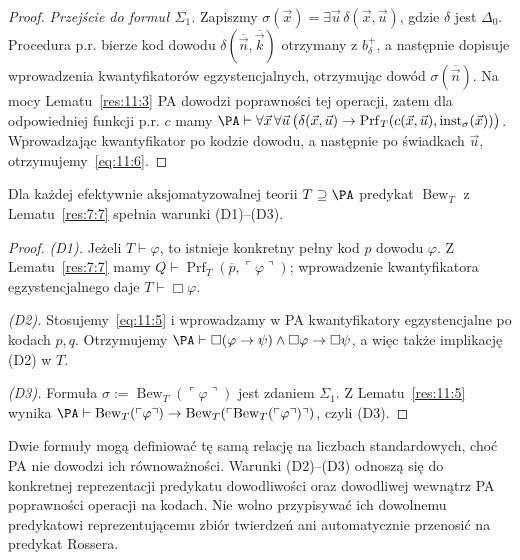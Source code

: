 \begin{proof}
\emph{Przejście do formuł $\Sigma_1$.} Zapiszmy $\sigma(\vec x)=\exists\vec u\,\delta(\vec x,\vec u)$, gdzie $\delta$ jest $\Delta_0$. Procedura p.r. bierze kod dowodu $\delta(\overline{\vec n},\overline{\vec k})$ otrzymany z $b_\delta^+$, a następnie dopisuje wprowadzenia kwantyfikatorów egzystencjalnych, otrzymując dowód $\sigma(\overline{\vec n})$. Na mocy Lematu~\ref{res:11:3} PA dowodzi poprawności tej operacji, zatem dla odpowiedniej funkcji p.r. $c$ mamy
$\PA\vdash\forall\vec x\,\forall\vec u\,\bigl(\delta(\vec x,\vec u)\to\operatorname{Prf}_T(c(\vec x,\vec u),\operatorname{inst}_\sigma(\vec x))\bigr)$.
Wprowadzając kwantyfikator po kodzie dowodu, a następnie po świadkach $\vec u$, otrzymujemy~\eqref{eq:11:6}.
\end{proof}

\begin{lemat}\label{res:11:6}
Dla każdej efektywnie aksjomatyzowalnej teorii $T\supseteq\PA$ predykat $\operatorname{Bew}_T$ z Lematu~\ref{res:7:7} spełnia warunki (D1)--(D3).
\end{lemat}
\begin{proof}
\emph{(D1).} Jeżeli $T\vdash\varphi$, to istnieje konkretny pełny kod $p$ dowodu $\varphi$. Z Lematu~\ref{res:7:7} mamy $Q\vdash\operatorname{Prf}_T(\overline p,\ulcorner\varphi\urcorner)$; wprowadzenie kwantyfikatora egzystencjalnego daje $T\vdash\Box\varphi$.

\emph{(D2).} Stosujemy~\eqref{eq:11:5} i wprowadzamy w PA kwantyfikatory egzystencjalne po kodach $p,q$. Otrzymujemy
$\PA\vdash\Box(\varphi\to\psi)\land\Box\varphi\to\Box\psi$, a więc także implikację (D2) w $T$.

\emph{(D3).} Formuła $\sigma:=\operatorname{Bew}_T(\ulcorner\varphi\urcorner)$ jest zdaniem $\Sigma_1$. Z Lematu~\ref{res:11:5} wynika
$\PA\vdash\operatorname{Bew}_T(\ulcorner\varphi\urcorner)\to
\operatorname{Bew}_T(\ulcorner\operatorname{Bew}_T(\ulcorner\varphi\urcorner)\urcorner)$,
czyli (D3).
\end{proof}

\begin{uwaga}\label{res:11:7}
Dwie formuły mogą definiować tę samą relację na liczbach standardowych, choć PA nie dowodzi ich równoważności. Warunki (D2)--(D3) odnoszą się do konkretnej reprezentacji predykatu dowodliwości oraz dowodliwej wewnątrz PA poprawności operacji na kodach. Nie wolno przypisywać ich dowolnemu predykatowi reprezentującemu zbiór twierdzeń ani automatycznie przenosić na predykat Rossera.
\end{uwaga}

